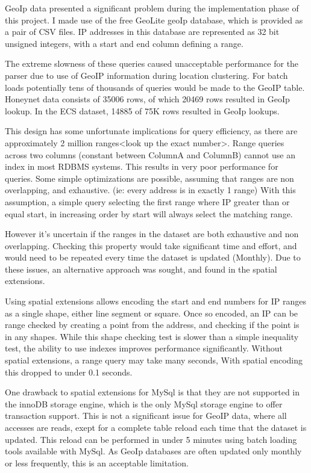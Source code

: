 GeoIp data presented a significant problem during the implementation phase of this project. I made use of the free GeoLite geoIp database, which is provided as a pair of CSV files. IP addresses in this database are represented as 32 bit unsigned integers, with a start and end column defining a range.

The extreme slowness of these queries caused unacceptable performance for the parser due to use of GeoIP information during location clustering. For batch loads potentially tens of thousands of queries would be made to the GeoIP table. Honeynet data consists of 35006 rows, of which 20469 rows resulted in GeoIp lookup. In the ECS dataset, 14885 of 75K rows resulted in GeoIp lookups. 

This design has some unfortunate implications for query efficiency, as there are approximately 2 million ranges<look up the exact number>. Range queries across two columns (constant between ColumnA and ColumnB) cannot use an index in most RDBMS systems. This results in very poor performance for queries.
Some simple optimizations are possible, assuming that ranges are non overlapping, and exhaustive. (ie: every address is in exactly 1 range)  With this assumption, a simple query selecting the first range where IP greater than or equal start, in increasing order by start will always select the matching range.

However it's uncertain if the ranges in the dataset are both exhaustive and non overlapping. Checking this property would take significant time and effort, and would need to be repeated  every time the dataset is updated (Monthly). Due to these issues, an alternative approach was sought, and found in the spatial extensions.

Using spatial extensions allows encoding the start and end numbers for IP ranges as a single shape, either line segment or square. Once so encoded, an IP can be range checked by creating a point from the address, and checking if the point is in any shapes. While this shape checking test is slower than a simple inequality test, the ability to use indexes improves performance significantly. Without spatial extensions, a range query may take many seconds, With spatial encoding this dropped to under 0.1 seconds.  

One drawback to spatial extensions for MySql is that they are not supported in the innoDB storage engine, which is the only MySql storage engine to offer transaction support. This is not a significant issue for GeoIP data, where all accesses are reads, exept for a complete table reload each time that the dataset is updated. This reload can be performed in under 5 minutes using batch loading tools available with MySql. As GeoIp databases are often updated only monthly or less frequently, this is an acceptable limitation. 


